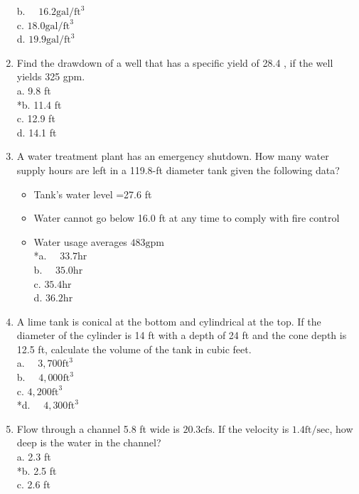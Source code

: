 \begin{enumerate}
b. $\quad 16.2 \mathrm{gal} / \mathrm{ft}^{3}$\\
c. $18.0 \mathrm{gal} / \mathrm{ft}^{3}$\\
d. $19.9 \mathrm{gal} / \mathrm{ft}^{3}$\\
\item Find the drawdown of a well that has a specific yield of 28.4 , if the well yields 325 gpm.\\
a. 9.8 ft\\
*b. 11.4 ft\\
c. 12.9 ft\\
d. 14.1 ft\\
\item A water treatment plant has an emergency shutdown. How many water supply hours are left in a 119.8-ft diameter tank given the following data?\\
\begin{itemize}
\item Tank's water level =27.6 ft\\
\item Water cannot go below 16.0 ft at any time to comply with fire control\\
\item Water usage averages $483 \mathrm{gpm}$\\
*a. $\quad 33.7 \mathrm{hr}$\\
b. $\quad 35.0 \mathrm{hr}$\\
c. $35.4 \mathrm{hr}$\\
d. $36.2 \mathrm{hr}$\\
\end{itemize}
\item A lime tank is conical at the bottom and cylindrical at the top. If the diameter of the cylinder is 14 ft with a depth of 24 ft and the cone depth is 12.5 ft, calculate the volume of the tank in cubic feet.\\
a. $\quad 3,700 \mathrm{ft}^{3}$\\
b. $\quad 4,000 \mathrm{ft}^{3}$\\
c. $4,200 \mathrm{ft}^{3}$\\
*d. $\quad 4,300 \mathrm{ft}^{3}$
\item Flow through a channel 5.8 ft wide is $20.3 \mathrm{cfs}$. If the velocity is $1.4 \mathrm{ft} / \mathrm{sec}$, how deep is the water in the channel?\\
a. 2.3 ft\\
*b. 2.5 ft\\
c. 2.6 ft\\

\end{enumerate}
